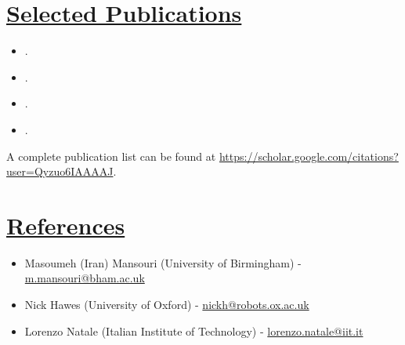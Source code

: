 \documentclass[11pt]{article}
\begin{document}
\section*{\underline{Selected Publications}}
\begin{itemize}
\item[\cite{street2024right}] .
\item[\cite{street2021congestion}] .	
\item[\cite{street2023formal}] .
\item[\cite{street2022context}] .
\end{itemize}

\noindent A complete publication list can be found at \url{https://scholar.google.com/citations?user=Qyzuo6IAAAAJ}.

\iffalse
\section*{\underline{Publications}}
\begin{itemize}
\item[\cite{street2024right}] \fullcite{street2024right}.
\item[\cite{street2023formal}] \fullcite{street2023formal}.
\item[\cite{zhang2023multi}] \fullcite{zhang2023multi}.
\item[\cite{street2023analysing}] \fullcite{street2023analysing}.
\item[\cite{lacerda2022decision}] \fullcite{lacerda2022decision}.
\item[\cite{street2022context}] \fullcite{street2022context}.
\item[\cite{street2021congestion}] \fullcite{street2021congestion}.	
\item[\cite{street2020multi}] \fullcite{street2020multi}.
\end{itemize}
\fi

\section*{\underline{References}}
\begin{itemize}
\item Masoumeh (Iran) Mansouri (University of Birmingham) - \href{mailto:m.mansouri@bham.ac.uk}{\url{m.mansouri@bham.ac.uk}}
\item Nick Hawes (University of Oxford) - \href{mailto:nickh@robots.ox.ac.uk}{\url{nickh@robots.ox.ac.uk}}
\item Lorenzo Natale (Italian Institute of Technology) - \href{lorenzo.natale@iit.it}{\url{lorenzo.natale@iit.it}}
\end{itemize}
\end{document}
